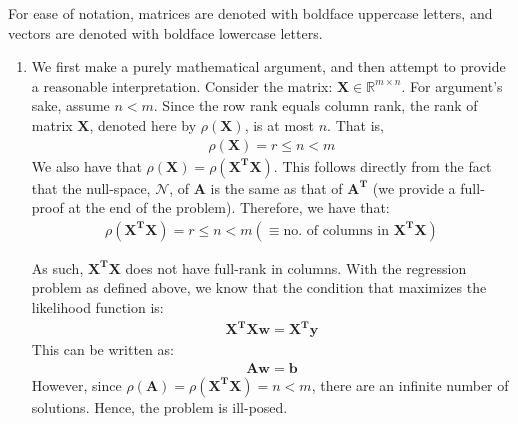 \documentclass[submit]{harvardml}
\renewcommand{\v}{\boldsymbol}
\begin{document}
For ease of notation, matrices are denoted with boldface uppercase letters, and vectors are denoted with boldface lowercase letters.
\begin{enumerate}[label=(\alph*)]
	\item We first make a purely mathematical argument, and then attempt to provide a reasonable interpretation. Consider the matrix: $\v{X} \in \mathbb{R}^{m \times n}$. For argument's sake, assume $n < m$. Since the row rank equals column rank, the rank of matrix $\v{X}$, denoted here by $\rho(\v{X})$, is at most $n$. That is, 
	\begin{align*}
		\rho(\v{X}) = r \leq n < m
	\end{align*}
	We also have that $\rho(\v{X}) = \rho(\v{X^T X})$. This follows directly from the fact that the null-space, $\mathcal{N}$, of $\v{A}$ is the same as that of $\v{A^T}$ (we provide a full-proof at the end of the problem). Therefore, we have that:
	\begin{align*}
		\rho(\v{X^T X}) = r \leq n < m  (\equiv \text{no. of columns in } \v{X^T X})
	\end{align*}
	
	As such, $\v{X^T X}$ does not have full-rank in columns. With the regression problem as defined above, we know that the condition that maximizes the likelihood function is:
	\begin{align*}
		\v{X^T X} \v{w} = \v{X^T y}
	\end{align*}
	This can be written as:
	\begin{align*}
		\v{A} \v{w} = \v{b}
	\end{align*}
	However, since $\rho(\v{A}) = \rho(\v{X^T X}) = n < m$, there are an infinite number of solutions. Hence, the problem is ill-posed.
	

\end{enumerate}
\end{document}
